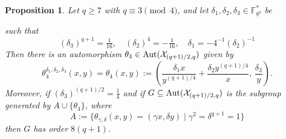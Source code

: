 \documentclass[12pt]{amsart}
\newtheorem{proposition}[theorem]{Proposition}
\theoremstyle{remark}
\theoremstyle{definition}
\def\Aut{{\rm Aut}}
\newcommand{\coloneqq}{\mathrel{:=}}
\begin{document}

\begin{proposition}\label{prop:bigger-aut}
    Let $q \ge 7$ with $q \equiv 3 \pmod{4}$, and let
    $\delta_1, \delta_2, \delta_3 \in \mathbb{F}_{q^2}^*$ be 

such that
$$
(\delta_3)^{q+1} = \tfrac{1}{16},\quad
(\delta_2)^4 = -\tfrac{1}{16},\quad
\delta_1 = -4^{-1} (\delta_2)^{-1}
$$
Then there is an automorphism $\theta_4 \in \Aut(\mathcal{X}_{(q+1)/2,q})$ given by
    \begin{equation}\label{theta4}
    \theta_4^{\delta_1,\delta_2,\delta_3}(x,y) =
        \theta_4(x, y) \coloneqq
        \left(\frac{\delta_1 x}{y^{(q+1)/4}}+\frac{\delta_2 y^{(q+1)/4}}{x},\,
              \frac{\delta_3}{y}\right).
    \end{equation}
Moreover, if $(\delta_3)^{(q+1)/2} = \frac{1}{4}$ and if $G \subseteq \Aut(\mathcal{X}_{(q+1)/2,q})$ is the subgroup generated by $A \cup \{\theta_4\}$, where
    $$A \coloneqq \{\theta_{\gamma,\delta}(x,y) = (\gamma x, \delta y)
            \mid \gamma^2 = \delta^{q+1} = 1\}$$
then $G$ has order $8(q+1)$.
\end{proposition}
\end{document}
